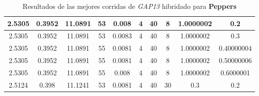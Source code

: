 \begin{table}[h!]
\begin{center}
\begin{tabular}{|c|c|c|c|c|c|c|c|c|c|}
            2.5305 & 0.3952  & 11.0891 & 53 & 0.008 & 4 & 40 & 8 & 1.0000002 & 0.2\\
        \hline
        \hline
            2.5305 & 0.3952  & 11.0891 & 53 & 0.0083 & 4 & 40 & 8 & 1.0000002 & 0.3\\
        \hline
        \hline
            2.5305 & 0.3952  & 11.0891 & 55 & 0.0081 & 4 & 40 & 8 & 1.0000002 & 0.40000004\\
        \hline
        \hline
            2.5305 & 0.3952  & 11.0891 & 55 & 0.0081 & 4 & 40 & 8 & 1.0000002 & 0.50000006\\
        \hline
        \hline
            2.5305 & 0.3952  & 11.0891 & 55 & 0.008 & 4 & 40 & 8 & 1.0000002 & 0.6000001\\
        \hline
        \hline
            2.5124 & 0.398  & 11.1241 & 53 & 0.0081 & 4 & 40 & 30 & 0.3 & 0.2\\
        \hline
        \end{tabular}
        \caption{Resultados de las mejores corridas de \emph{GAP13} hibridado para {\bf Peppers}}
        \label{tb:tableGAP13}
    \end{center}
\end{table}
